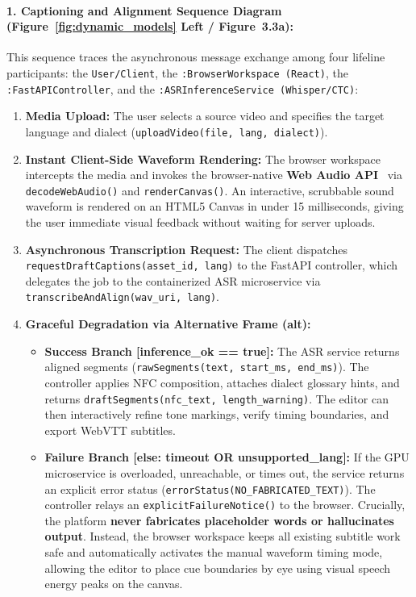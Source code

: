 \documentclass[conference]{IEEEtran}
\begin{document}
\paragraph{1. Captioning and Alignment Sequence Diagram (Figure~\ref{fig:dynamic_models} Left / Figure~3.3a):}
This sequence traces the asynchronous message exchange among four lifeline participants: the \texttt{User/Client}, the \texttt{:BrowserWorkspace (React)}, the \texttt{:FastAPIController}, and the \texttt{:ASRInferenceService (Whisper/CTC)}:
\begin{enumerate}
    \item \textbf{Media Upload:} The user selects a source video and specifies the target language and dialect (\texttt{uploadVideo(file, lang, dialect)}).
    \item \textbf{Instant Client-Side Waveform Rendering:} The browser workspace intercepts the media and invokes the browser-native \textbf{Web Audio API}~\cite{w3c2021webaudio} via \texttt{decodeWebAudio()} and \texttt{renderCanvas()}. An interactive, scrubbable sound waveform is rendered on an HTML5 Canvas in under 15 milliseconds, giving the user immediate visual feedback without waiting for server uploads.
    \item \textbf{Asynchronous Transcription Request:} The client dispatches \texttt{requestDraftCaptions(asset\_id, lang)} to the FastAPI controller, which delegates the job to the containerized ASR microservice via \texttt{transcribeAndAlign(wav\_uri, lang)}.
    \item \textbf{Graceful Degradation via Alternative Frame (alt):}
    \begin{itemize}
        \item \textbf{Success Branch [inference\_ok == true]:} The ASR service returns aligned segments (\texttt{rawSegments(text, start\_ms, end\_ms)}). The controller applies NFC composition, attaches dialect glossary hints, and returns \texttt{draftSegments(nfc\_text, length\_warning)}. The editor can then interactively refine tone markings, verify timing boundaries, and export WebVTT subtitles.
        \item \textbf{Failure Branch [else: timeout OR unsupported\_lang]:} If the GPU microservice is overloaded, unreachable, or times out, the service returns an explicit error status (\texttt{errorStatus(NO\_FABRICATED\_TEXT)}). The controller relays an \texttt{explicitFailureNotice()} to the browser. Crucially, the platform \textbf{never fabricates placeholder words or hallucinates output}. Instead, the browser workspace keeps all existing subtitle work safe and automatically activates the manual waveform timing mode, allowing the editor to place cue boundaries by eye using visual speech energy peaks on the canvas.
    \end{itemize}
\end{enumerate}
\end{document}
